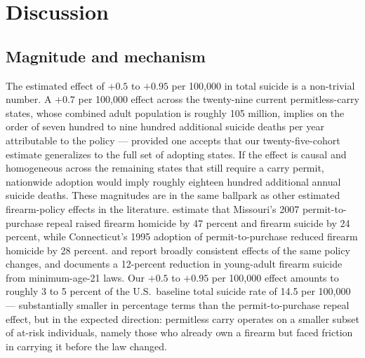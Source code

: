\documentclass[12pt]{article}
\begin{document}
\section{Discussion}\label{sec:discussion}

\subsection{Magnitude and mechanism}\label{sec:magnitude}

The estimated effect of $+0.5$ to $+0.95$ per 100,000 in total
suicide is a non-trivial number. A $+0.7$ per 100,000 effect across
the twenty-nine current permitless-carry states, whose combined
adult population is roughly 105 million, implies on the order of
seven hundred to nine hundred additional suicide deaths per year
attributable to the policy --- provided one accepts that our
twenty-five-cohort estimate generalizes to the full set of adopting
states. If the effect is causal and homogeneous across the
remaining states that still require a carry permit, nationwide
adoption would imply roughly eighteen hundred additional annual
suicide deaths. These magnitudes are in the same ballpark as other
estimated firearm-policy effects in the literature.
\citet{mccourt2020} estimate that Missouri's 2007 permit-to-purchase
repeal raised firearm homicide by 47 percent and firearm suicide by
24 percent, while Connecticut's 1995 adoption of permit-to-purchase
reduced firearm homicide by 28 percent. \citet{crifasi2015} and
\citet{webster2014} report broadly consistent effects of the same
policy changes, and \citet{crifasi2024} documents a 12-percent
reduction in young-adult firearm suicide from minimum-age-21 laws.
Our $+0.5$ to $+0.95$ per 100,000 effect amounts to roughly 3 to 5
percent of the U.S.\ baseline total suicide rate of 14.5 per
100,000 \citep{cdcwonder} --- substantially smaller in percentage
terms than the permit-to-purchase repeal effect, but in the
expected direction: permitless carry operates on a smaller subset
of at-risk individuals, namely those who already own a firearm but
faced friction in carrying it before the law changed.
\end{document}
